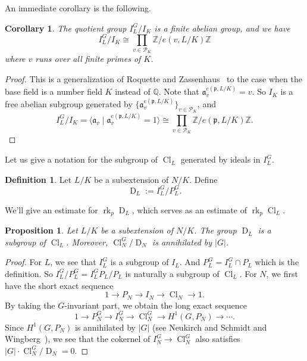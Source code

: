 \documentclass{amsart}
\numberwithin{equation}{section}
\theoremstyle{plain}
\newtheorem{proposition}[theorem]{Proposition}
\newtheorem{corollary}[theorem]{Corollary}
\theoremstyle{definition}
\newtheorem{definition}[theorem]{Definition}
\theoremstyle{remark}
\begin{document}
An immediate corollary is the following.
\begin{corollary}\label{cor: I(L)^G/I(K)}
	The quotient group $I_L^G/I_K$ is a finite abelian group, and we have
	\begin{equation*}
		I_L^G/I_K\cong\prod_{v\in\mathcal{P}_K}\mathbb{Z}/e(v,L/K)\mathbb{Z}
	\end{equation*}
	where $v$ runs over all finite primes of $K$.
\end{corollary}
\begin{proof}
	This is a generalization of Roquette and Zassenhaus~\cite[(8)]{RZ1969ClassRank} to the case when the base field is a number field $K$ instead of $\mathbb{Q}$. 
	Note that $\mathfrak{a}_v^{e(\mathfrak{p},L/K)}=v$.
	So $I_K$ is a free abelian subgroup generated by $\{\mathfrak{a}_v^{e(\mathfrak{p},L/K)}\}_{v\in\mathcal{P}_K}$, and 
	\begin{equation*}
		I_L^G/I_K=\langle\mathfrak{a}_v\mid\mathfrak{a}_v^{e(\mathfrak{p},L/K)}=1\rangle\cong\prod_{v\in\mathcal{P}_K}\mathbb{Z}/e(\mathfrak{p},L/K)\mathbb{Z}.
	\end{equation*}
\end{proof}
Let us give a notation for the subgroup of $\operatorname{Cl}_L$ generated by ideals in $I_L^G$.
\begin{definition}\label{def: invariant part of fractional ideals}
    Let $L/K$ be a subextension of $N/K$.
    Define
	\begin{equation*}
		\operatorname{D}_{L}:=I_{L}^G/P_{L}^G.
	\end{equation*}
\end{definition}
We'll give an estimate for $\operatorname{rk}_p\operatorname{D}_L$, which serves as an estimate of $\operatorname{rk}_p\operatorname{Cl}_L$.
\begin{proposition}\label{prop: D(L) subgroup of Cl(L)}
    Let $L/K$ be a subextension of $N/K$.
    The group \(\operatorname{D}_{L}\) is a subgroup of \(\operatorname{Cl}_{L}\).
    Moreover, \(\operatorname{Cl}_N^G/\operatorname{D}_N\) is annihilated by \(\lvert G\rvert\).
\end{proposition}
\begin{proof}
	For $L$, we see that $I_L^G$ is a subgroup of $I_L$.
	And $P_L^G=I_L^G\cap P_L$ which is the definition.
	So $I_L^G/P_L^G=I_L^GP_L/P_L$ is naturally a subgroup of $\operatorname{Cl}_L$.
	For $N$, we first have the short exact sequence
	\begin{equation*}
		1\to P_N\to I_N\to\operatorname{Cl}_N\to1.
	\end{equation*}
	By taking the $G$-invariant part, we obtain the long exact sequence
	\begin{equation*}
		1\to P_N^G\to I_N^G\to\operatorname{Cl}_N^G\to H^1(G,P_N)\to\cdots.
	\end{equation*}
	Since $H^1(G,P_N)$ is annihilated by \(\lvert G\rvert\) (see Neukirch and Schmidt and Wingberg~\cite[1.6.1]{neukirch2013cohomology}), we see that the cokernel of $I_N^G\to\operatorname{Cl}_N^G$ also satisfies \(\lvert G\rvert\cdot\operatorname{Cl}_N^G/\operatorname{D}_N=0\).
\end{proof}
\end{document}
